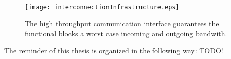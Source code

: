 \begin{figure}
  \begin{center}
		 \texttt{[image: interconnectionInfrastructure.eps]}
  \caption{The high throughput communication interface guarantees the functional blocks a worst case incoming and outgoing bandwith.}
  \label{interconnectionInfrastructure.eps}
  \end{center}
\end{figure}
The reminder of this thesis is organized in the following way: TODO!